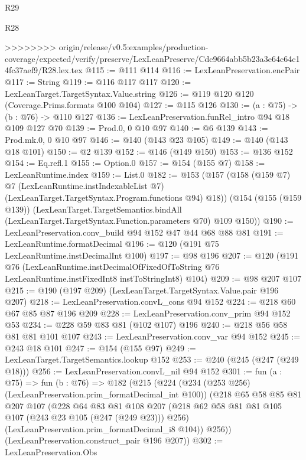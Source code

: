 \begin{lexlean}{R29}
\begin{lexlean}{R28}
\begin{coremodule}
{{{{{>>>>>>>> origin/release/v0.5:examples/production-coverage/expected/verify/preserve/LexLeanPreserve/Cdc9664abb5b23a3e64c64c14fc37aef9/R28.lex.tex
@115 := @111 @114
@116 := LexLeanPreservation.encPair
@117 := String
@119 := @116 @117 @117
@120 := LexLeanTarget.TargetSyntax.Value.string
@126 := @119 @120 @120 (Coverage.Prims.formats @100 @104)
@127 := @115 @126
@130 := (a : @75) -> (b : @76) -> @110 @127
@136 := LexLeanPreservation.funRel_intro @94 @18 @109 @127 @70
@139 := Prod.{0, 0} @10 @97
@140 := @6 @139
@143 := Prod.mk.{0, 0} @10 @97
@146 := @140 (@143 @23 @105)
@149 := @140 (@143 @18 @101)
@150 := @2 @139
@152 := @146 (@149 @150)
@153 := @136 @152
@154 := Eq.refl.{1}
@155 := Option.{0}
@157 := @154 (@155 @7)
@158 := LexLeanRuntime.index
@159 := List.{0}
@182 := @153
    (@157
      (@158
        (@159 @7)
        @7
        (LexLeanRuntime.instIndexableList @7)
        (LexLeanTarget.TargetSyntax.Program.functions @94)
        @18))
    (@154
      (@155 (@159 @139))
      (LexLeanTarget.TargetSemantics.bindAll
        (LexLeanTarget.TargetSyntax.Function.parameters @70)
        @109
        @150))
@190 := LexLeanPreservation.conv_build @94 @152 @47 @44 @68 @88 @81
@191 := LexLeanRuntime.formatDecimal
@196 := @120 (@191 @75 LexLeanRuntime.instDecimalInt @100)
@197 := @98 @196
@207 := @120
    (@191
      @76
      (LexLeanRuntime.instDecimalOfFixedOfToString
        @76
        LexLeanRuntime.instFixedInt8
        instToStringInt8)
      @104)
@209 := @98 @207 @107
@215 := @190 (@197 @209) (LexLeanTarget.TargetSyntax.Value.pair @196 @207)
@218 := LexLeanPreservation.convL_cons @94 @152
@224 := @218 @60 @67 @85 @87 @196 @209
@228 := LexLeanPreservation.conv_prim @94 @152 @53
@234 := @228 @59 @83 @81 (@102 @107) @196
@240 := @218 @56 @58 @81 @81 @101 @107
@243 := LexLeanPreservation.conv_var @94 @152
@245 := @243 @18 @101
@247 := @154 (@155 @97)
@249 := LexLeanTarget.TargetSemantics.lookup @152
@253 := @240 (@245 (@247 (@249 @18)))
@256 := LexLeanPreservation.convL_nil @94 @152
@301 := fun (a : @75) =>
  fun (b : @76) =>
  @182
    (@215
      (@224
        (@234 (@253 @256) (LexLeanPreservation.prim_formatDecimal_int @100))
        (@218
          @65
          @58
          @85
          @81
          @207
          @107
          (@228
            @64
            @83
            @81
            @108
            @207
            (@218 @62 @58 @81 @81 @105 @107 (@243 @23 @105 (@247 (@249 @23))) @256)
            (LexLeanPreservation.prim_formatDecimal_i8 @104))
          @256))
      (LexLeanPreservation.construct_pair @196 @207))
@302 := LexLeanPreservation.Obs
}}}}}
\end{coremodule}
\end{lexlean}
\end{lexlean}
